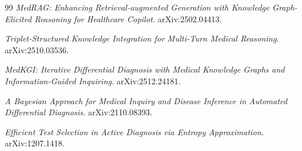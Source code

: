 \documentclass[11pt]{article}
\begin{document}
\begin{thebibliography}{99}
\emph{MedRAG: Enhancing Retrieval-augmented Generation with Knowledge Graph-Elicited Reasoning for Healthcare Copilot}.
\newblock arXiv:2502.04413.

\emph{Triplet-Structured Knowledge Integration for Multi-Turn Medical Reasoning}.
\newblock arXiv:2510.03536.

\emph{MedKGI: Iterative Differential Diagnosis with Medical Knowledge Graphs and Information-Guided Inquiring}.
\newblock arXiv:2512.24181.

\emph{A Bayesian Approach for Medical Inquiry and Disease Inference in Automated Differential Diagnosis}.
\newblock arXiv:2110.08393.

\emph{Efficient Test Selection in Active Diagnosis via Entropy Approximation}.
\newblock arXiv:1207.1418.

\end{thebibliography}
\end{document}
